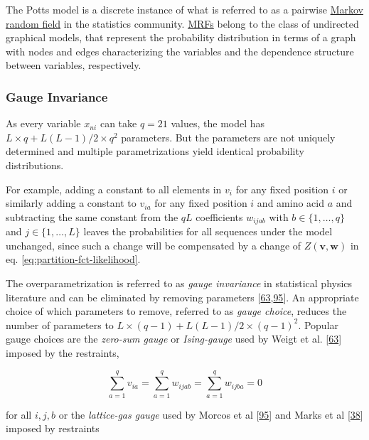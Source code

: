 \documentclass[11pt,a4paper,twoside]{book}
\renewcommand{\v}{\mathbf{v}}
\newcommand{\via}{v_{ia}}
\newcommand{\w}{\mathbf{w}}
\newcommand{\wijab}{w_{ijab}}
\theoremstyle{definition}
\theoremstyle{definition}
\theoremstyle{remark}
\begin{document}
The Potts model is a discrete instance of what is referred to as a
pairwise \protect\hyperlink{abbrev}{Markov random field} in the
statistics community. \protect\hyperlink{abbrev}{MRFs} belong to the
class of undirected graphical models, that represent the probability
distribution in terms of a graph with nodes and edges characterizing the
variables and the dependence structure between variables, respectively.

\subsubsection{Gauge Invariance}\label{gauge-invariance}

As every variable \(x_{ni}\) can take \(q=21\) values, the model has
\(L \! \times \! q + L(L-1)/2 \! \times \! q^2\) parameters. But the
parameters are not uniquely determined and multiple parametrizations
yield identical probability distributions.

For example, adding a constant to all elements in \(v_i\) for any fixed
position \(i\) or similarly adding a constant to \(\via\) for any fixed
position \(i\) and amino acid \(a\) and subtracting the same constant
from the \(qL\) coefficients \(\wijab\) with \(b \in \{1, \ldots, q\}\)
and \(j \in \{1, \ldots, L \}\) leaves the probabilities for all
sequences under the model unchanged, since such a change will be
compensated by a change of \(Z(\v, \w)\) in eq.
\eqref{eq:partition-fct-likelihood}.

The overparametrization is referred to as \emph{gauge invariance} in
statistical physics literature and can be eliminated by removing
parameters
{[}\protect\hyperlink{ref-Weigt2009}{63},\protect\hyperlink{ref-Morcos2011}{95}{]}.
An appropriate choice of which parameters to remove, referred to as
\emph{gauge choice}, reduces the number of parameters to
\(L \! \times \! (q-1) + L(L-1)/2 \! \times \! (q-1)^2\). Popular gauge
choices are the \emph{zero-sum gauge} or \emph{Ising-gauge} used by
Weigt et al. {[}\protect\hyperlink{ref-Weigt2009}{63}{]} imposed by the
restraints,

\begin{equation}
    \sum_{a=1}^{q} v_{ia} = \sum_{a=1}^{q} \wijab = \sum_{a=1}^{q} w_{ijba} = 0
\label{eq:zero-sum-gauge}
\end{equation}

for all \(i,j,b\) or the \emph{lattice-gas gauge} used by Morcos et al
{[}\protect\hyperlink{ref-Morcos2011}{95}{]} and Marks et al
{[}\protect\hyperlink{ref-Marks2011}{38}{]} imposed by restraints
\end{document}
